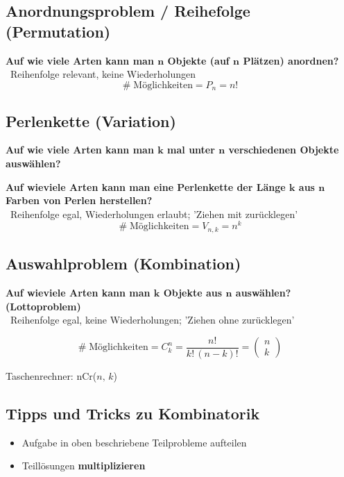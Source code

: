 \subsection{Anordnungsproblem / Reihefolge (Permutation)}

\textbf{Auf wie viele Arten kann man $\bm{n}$ Objekte (auf $\bm{n}$ Plätzen) anordnen?} \\
\textrightarrow\ Reihenfolge relevant, keine Wiederholungen
$$ \boxed{ \text{\#} \; \text{Möglichkeiten} = P_n = n! }$$


\subsection{Perlenkette (Variation)}
\textbf{Auf wie viele Arten kann man $\bm{k}$ mal unter $\bm{n}$ verschiedenen Objekte auswählen?}

\vspace{0.1cm}
\textbf{Auf wieviele Arten kann man eine Perlenkette der Länge $\bm{k}$ aus $\bm{n}$ Farben von Perlen herstellen?} \\
\textrightarrow\ Reihenfolge egal, Wiederholungen erlaubt; 'Ziehen mit zurücklegen'
$$\boxed{ \text{\#} \; \text{Möglichkeiten} = V_{n,k} = n^k } $$ 


\subsection{Auswahlproblem (Kombination)}

\textbf{Auf wieviele Arten kann man $\bm{k}$ Objekte aus $\bm{n}$ auswählen? (Lottoproblem)} \\
\textrightarrow\ Reihenfolge egal, keine Wiederholungen; 'Ziehen ohne zurücklegen'

$$\boxed{ \text{\#} \; \text{Möglichkeiten} = C_k^n = \frac{n!}{k! \, (n-k)!} = 
\begin{pmatrix} n \\ k \end{pmatrix} } $$ 

Taschenrechner: nCr($n, \, k$)


\subsection{Tipps und Tricks zu Kombinatorik}
\begin{itemize}
	\item Aufgabe in oben beschriebene Teilprobleme aufteilen
	\item Teillösungen \textbf{multiplizieren}
\end{itemize}


